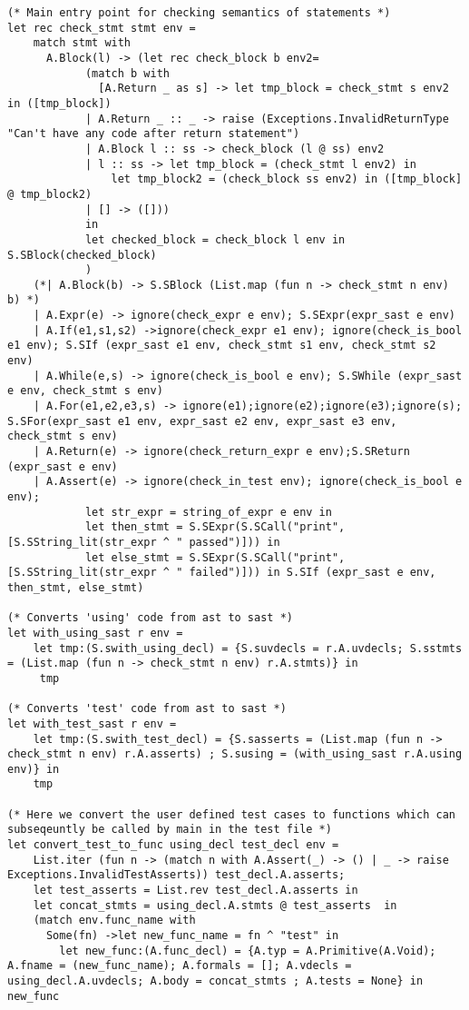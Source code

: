 \documentclass{article}
\begin{document}
\begin{lstlisting}
(* Main entry point for checking semantics of statements *)
let rec check_stmt stmt env = 
	match stmt with
	  A.Block(l) -> (let rec check_block b env2=
			(match b with
			  [A.Return _ as s] -> let tmp_block = check_stmt s env2 in ([tmp_block]) 
			| A.Return _ :: _ -> raise (Exceptions.InvalidReturnType "Can't have any code after return statement")
			| A.Block l :: ss -> check_block (l @ ss) env2
			| l :: ss -> let tmp_block = (check_stmt l env2) in 
				let tmp_block2 = (check_block ss env2) in ([tmp_block] @ tmp_block2)
			| [] -> ([]))
			in
			let checked_block = check_block l env in S.SBlock(checked_block)
			) 
	(*| A.Block(b) -> S.SBlock (List.map (fun n -> check_stmt n env) b) *)
	| A.Expr(e) -> ignore(check_expr e env); S.SExpr(expr_sast e env)
	| A.If(e1,s1,s2) ->ignore(check_expr e1 env); ignore(check_is_bool e1 env); S.SIf (expr_sast e1 env, check_stmt s1 env, check_stmt s2 env)
	| A.While(e,s) -> ignore(check_is_bool e env); S.SWhile (expr_sast e env, check_stmt s env)
	| A.For(e1,e2,e3,s) -> ignore(e1);ignore(e2);ignore(e3);ignore(s); S.SFor(expr_sast e1 env, expr_sast e2 env, expr_sast e3 env, check_stmt s env) 
	| A.Return(e) -> ignore(check_return_expr e env);S.SReturn (expr_sast e env)
	| A.Assert(e) -> ignore(check_in_test env); ignore(check_is_bool e env); 
			let str_expr = string_of_expr e env in  
			let then_stmt = S.SExpr(S.SCall("print", [S.SString_lit(str_expr ^ " passed")])) in 
			let else_stmt = S.SExpr(S.SCall("print", [S.SString_lit(str_expr ^ " failed")])) in S.SIf (expr_sast e env, then_stmt, else_stmt)

(* Converts 'using' code from ast to sast *)
let with_using_sast r env = 
	let tmp:(S.swith_using_decl) = {S.suvdecls = r.A.uvdecls; S.sstmts = (List.map (fun n -> check_stmt n env) r.A.stmts)} in
	 tmp

(* Converts 'test' code from ast to sast *)
let with_test_sast r env =
	let tmp:(S.swith_test_decl) = {S.sasserts = (List.map (fun n -> check_stmt n env) r.A.asserts) ; S.susing = (with_using_sast r.A.using env)} in
	tmp 

(* Here we convert the user defined test cases to functions which can subseqeuntly be called by main in the test file *)
let convert_test_to_func using_decl test_decl env = 
	List.iter (fun n -> (match n with A.Assert(_) -> () | _ -> raise Exceptions.InvalidTestAsserts)) test_decl.A.asserts;
	let test_asserts = List.rev test_decl.A.asserts in
	let concat_stmts = using_decl.A.stmts @ test_asserts  in
	(match env.func_name with
	  Some(fn) ->let new_func_name = fn ^ "test" in  
		let new_func:(A.func_decl) = {A.typ = A.Primitive(A.Void); A.fname = (new_func_name); A.formals = []; A.vdecls =  using_decl.A.uvdecls; A.body = concat_stmts ; A.tests = None} in new_func


\end{lstlisting}
\end{document}
